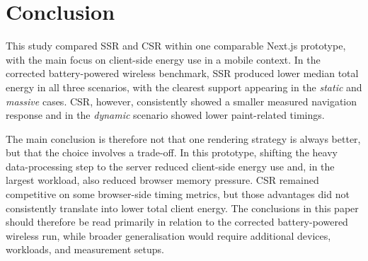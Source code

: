 \section{Conclusion}

This study compared SSR and CSR within one comparable Next.js prototype, with the main focus on client-side energy use in a mobile context. In the corrected battery-powered wireless benchmark, SSR produced lower median total energy in all three scenarios, with the clearest support appearing in the \textit{static} and \textit{massive} cases. CSR, however, consistently showed a smaller measured navigation response and in the \textit{dynamic} scenario showed lower paint-related timings.

The main conclusion is therefore not that one rendering strategy is always better, but that the choice involves a trade-off. In this prototype, shifting the heavy data-processing step to the server reduced client-side energy use and, in the largest workload, also reduced browser memory pressure. CSR remained competitive on some browser-side timing metrics, but those advantages did not consistently translate into lower total client energy. The conclusions in this paper should therefore be read primarily in relation to the corrected battery-powered wireless run, while broader generalisation would require additional devices, workloads, and measurement setups.
